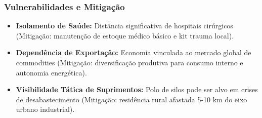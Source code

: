 \subsubsection{Vulnerabilidades e
Mitigação}

\begin{itemize}
\tightlist
\item
  \textbf{Isolamento de Saúde:} Distância significativa de hospitais
  cirúrgicos (Mitigação: manutenção de estoque médico básico e kit
  trauma local).
\item
  \textbf{Dependência de Exportação:} Economia vinculada ao mercado
  global de commodities (Mitigação: diversificação produtiva para
  consumo interno e autonomia energética).
\item
  \textbf{Visibilidade Tática de Suprimentos:} Polo de silos pode ser
  alvo em crises de desabastecimento (Mitigação: residência rural
  afastada 5-10 km do eixo urbano industrial).
\end{itemize}

